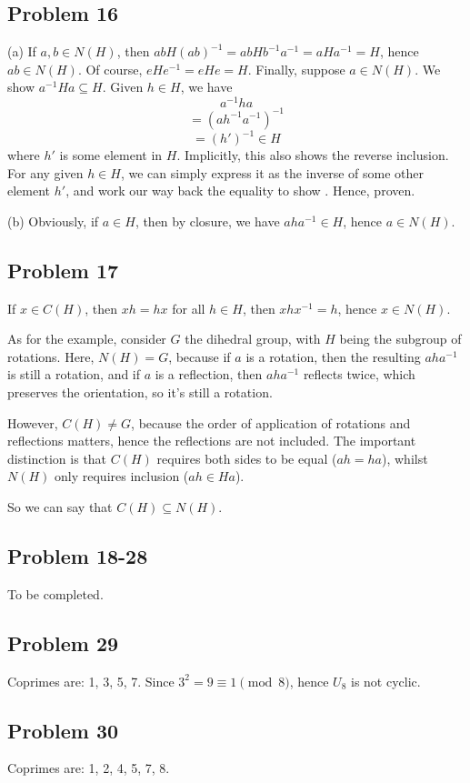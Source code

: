 \documentclass{book}
\begin{document}
\subsection*{Problem 16}
(a)
If $a, b \in N(H)$, then $abH(ab)^{-1} = abHb^{-1}a^{-1} = aHa^{-1} = H$, hence $ab \in N(H)$. Of course, $eHe^{-1} = eHe = H$. Finally, suppose $a \in N(H)$. We show $a^{-1}Ha \subseteq H$. Given $h \in H$, we have
$$a^{-1}ha$$
$$= (ah^{-1}a^{-1})^{-1}$$
$$= (h')^{-1} \in H$$
where $h'$ is some element in $H$. Implicitly, this also shows the reverse inclusion. For any given $h \in H$, we can simply express it as the inverse of some other element $h'$, and work our way back the equality to show . Hence, proven.

\noindent
(b)
Obviously, if $a \in H$, then by closure, we have $aha^{-1} \in H$, hence $a \in N(H)$.

\subsection*{Problem 17}
If $x \in C(H)$, then $xh = hx$ for all $h \in H$, then $xhx^{-1} = h$, hence $x \in N(H)$.

As for the example, consider $G$ the dihedral group, with $H$ being the subgroup of rotations. Here, $N(H) = G$, because if $a$ is a rotation, then the resulting $aha^{-1}$ is still a rotation, and if $a$ is a reflection, then $aha^{-1}$ reflects twice, which preserves the orientation, so it's still a rotation.

However, $C(H) \neq G$, because the order of application of rotations and reflections matters, hence the reflections are not included. The important distinction is that $C(H)$ requires both sides to be equal ($ah = ha$), whilst $N(H)$ only requires inclusion ($ah \in Ha$).

So we can say that $C(H) \subseteq N(H)$.

\subsection*{Problem 18-28}
To be completed.

\subsection*{Problem 29}
Coprimes are: 1, 3, 5, 7. Since $3^2 = 9 \equiv 1 \pmod 8$, hence $U_8$ is not cyclic.

\subsection*{Problem 30}
Coprimes are: 1, 2, 4, 5, 7, 8.
\end{document}
